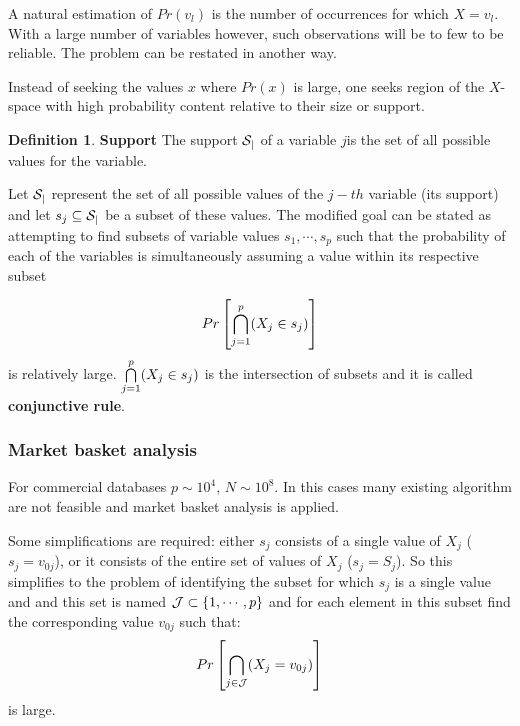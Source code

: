 \documentclass[12pt, letterpaper]{article}
\theoremstyle{definition}
\newtheorem{definition}{Definition}[section]
\DeclarePairedDelimiter\autobracket{(}{)}
\newcommand{\br}[1]{\autobracket*{#1}}
\begin{document}
A natural estimation of $Pr(v_l)$ is the number of occurrences for which $X=v_l$. With a large number of variables however, such observations will be to few to be reliable. The problem can be restated in another way.

Instead of seeking the values $x$ where $Pr(x)$ is large, one seeks region of the $X$-space with high probability content relative to their size or support.
\begin{definition}{\textbf{Support}}
The support $\CMcal{S_j}$ of a variable $j$is the set of all possible values for the variable.
\end{definition}
Let $\CMcal{S_j}$ represent the set of all possible values of the $j-th$ variable (its support) and let $ s_j \subseteq \CMcal{S_j}$ be a subset of these values. The modified goal can be stated as attempting to find subsets of variable values $s_1, \cdots, s_p$ such that the probability of each of the  variables is simultaneously assuming a value within its respective subset

\begin{equation}
Pr\left[ \bigcap\limits_{j = 1}^p \br{X_j \in s_j}\right]
\end{equation}
 is relatively large. $\bigcap\limits_{j = 1}^p \br{X_j \in s_j}$ is the intersection of subsets and it is called \textbf{conjunctive rule}.

\subsubsection{Market basket analysis}
For commercial databases $p\sim 10^4$, $N \sim 10^8$. In this cases many existing algorithm are not feasible and market basket analysis is applied.

Some simplifications are required: either $s_j$ consists of a single value of $X_j$ ($s_j = v_{0j}$), or it consists of the entire set of values of $X_j$ ($s_j = S_j$). So this simplifies to the problem of identifying the subset for which $s_j$ is a single value and and this  set is named $\CMcal{J} \subset \{1,\cdots,p\}$ and for each element in this subset find the corresponding value $v_{0j}$ such that:
\begin{equation}
Pr\left[ \bigcap\limits_{j \in \CMcal{J}} \br{X_j = v_{0j}}\right]
\label{dummyVarProb}
\end{equation}
is large.
\end{document}
